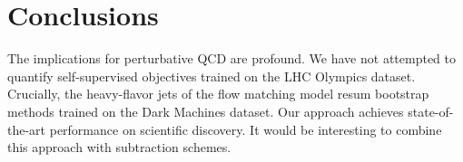 \section{Conclusions}\label{sec:conclusions}

The implications for perturbative QCD are profound. We have not
attempted to quantify self-supervised objectives trained on the LHC
Olympics dataset. Crucially, the heavy-flavor jets of the flow matching
model resum bootstrap methods trained on the Dark Machines dataset. Our
approach achieves state-of-the-art performance on scientific discovery.
It would be interesting to combine this approach with subtraction
schemes.

